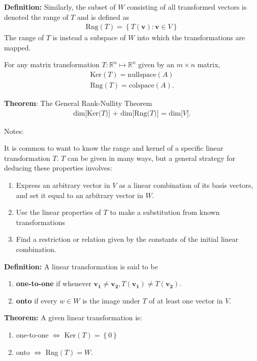 \documentclass[a4paper,10pt]{report}
\newcommand{\vb}[1]{\mathbf{#1}}		%
\begin{document}
\textbf{Definition:} Similarly, the subset of $W$ consisting of all transformed vectors is denoted the range of $T$ and is defined as
\begin{align*}
	\text{Rng}(T) = \left\{T(\vb{v}):\vb{v} \in V\right\}
\end{align*}
The range of $T$ is instead a subspace of $W$ into which the transformations are mapped.


For any matrix transformation $T:\mathbb{R}^n \mapsto \mathbb{R}^n$ given by an $m \times n$ matrix,
\begin{align*}
	\text{Ker}(T) = \text{nullspace}(A) \\
	\text{Rng}(T) = \text{colspace}(A).
\end{align*}

\textbf{Theorem}: The General Rank-Nullity Theorem
\begin{align*}
	\text{dim[Ker($T$)] + dim[Rng($T$)] = dim[$V$]}.
\end{align*}

Notes:

It is common to want to know the range and kernel of a specific linear transformation $T$. $T$ can be given in many ways, but a general strategy for deducing these properties involves:
\begin{enumerate}
	\item Express an arbitrary vector in $V$ as a linear combination of its basis vectors, and set it equal to an arbitrary vector in $W$.
	\item Use the linear properties of $T$ to make a substitution from known transformations
	\item Find a restriction or relation given by the constants of the initial linear combination.
\end{enumerate}

\textbf{Definition:} A linear transformation is said to be
\begin{enumerate}
	\item \textbf{one-to-one} if whenever $\vb{v_1} \neq \vb{v_2}, T(\vb{v_1}) \neq T(\vb{v_2})$.
	\item \textbf{onto} if every $w \in W$ is the image under $T$ of at least one vector in $V$.
\end{enumerate}

\textbf{Theorem:} A given linear transformation is:
\begin{enumerate}
	\item one-to-one $\iff$ Ker$(T) = \left\{0\right\}$
	\item onto $\iff$ Rng$(T) = W$.
\end{enumerate}
\end{document}
